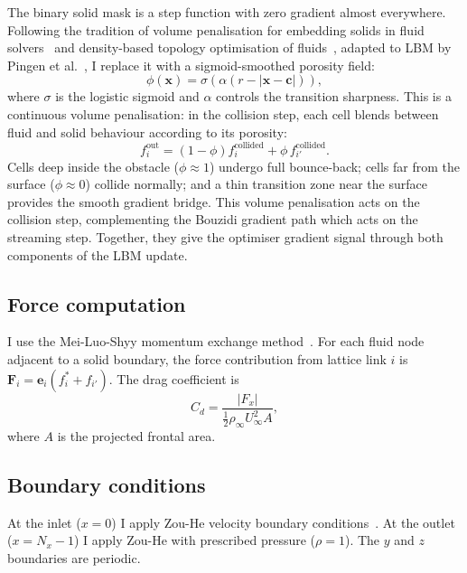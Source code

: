 \documentclass[10pt,twocolumn]{article}
\begin{document}
The binary solid mask is a step function with zero gradient almost
everywhere. Following the tradition of volume penalisation for
embedding solids in fluid
solvers~\cite{angot1999} and density-based topology optimisation of
fluids~\cite{borrvall2003}, adapted to LBM by Pingen et
al.~\cite{pingen2007}, I replace it with a sigmoid-smoothed porosity
field:
%
\begin{equation}
\phi(\mathbf{x}) = \sigma\!\left(\alpha (r - |\mathbf{x} - \mathbf{c}|)\right),
\label{eq:porosity}
\end{equation}
%
where $\sigma$ is the logistic sigmoid and $\alpha$ controls the
transition sharpness. This is a continuous volume penalisation: in the
collision step, each cell blends between fluid and solid behaviour
according to its porosity:
%
\begin{equation}
f_i^{\text{out}} = (1 - \phi) f_i^{\text{collided}} + \phi \, f_{i'}^{\text{collided}}.
\end{equation}
%
Cells deep inside the obstacle ($\phi \approx 1$) undergo full
bounce-back; cells far from the surface ($\phi \approx 0$) collide
normally; and a thin transition zone near the surface provides the
smooth gradient bridge. This volume penalisation acts on the collision
step, complementing the Bouzidi gradient path which acts on the
streaming step. Together, they give the optimiser gradient signal
through both components of the LBM update.

\subsection{Force computation}

I use the Mei-Luo-Shyy momentum exchange method~\cite{mei2002}. For
each fluid node adjacent to a solid boundary, the force contribution
from lattice link $i$ is
$\mathbf{F}_i = \mathbf{e}_i (f_i^* + f_{i'})$.
The drag coefficient is
%
\begin{equation}
C_d = \frac{|F_x|}{\frac{1}{2} \rho_\infty U_\infty^2 A},
\end{equation}
%
where $A$ is the projected frontal area.

\subsection{Boundary conditions}

At the inlet ($x = 0$) I apply Zou-He velocity boundary
conditions~\cite{zou1997}. At the outlet ($x = N_x - 1$) I apply
Zou-He with prescribed pressure ($\rho = 1$). The $y$ and $z$ boundaries
are periodic.
\end{document}
